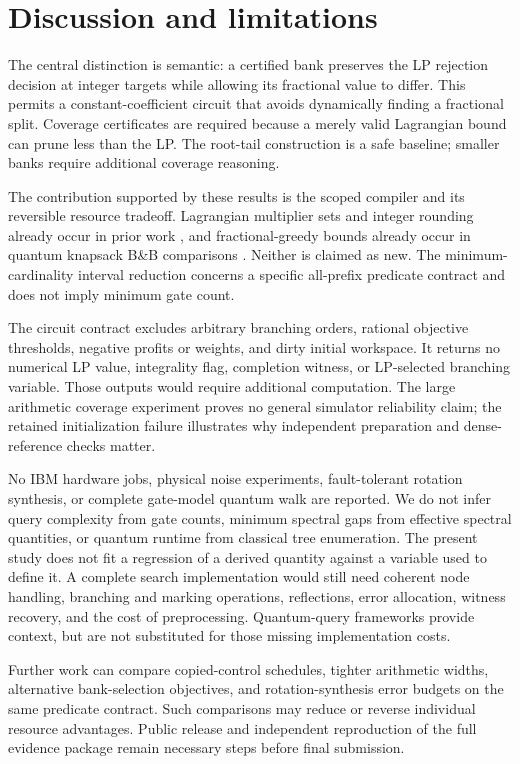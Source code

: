 \documentclass[referee,pdflatex,sn-mathphys-num]{sn-jnl}
\theoremstyle{thmstyleone}
\theoremstyle{thmstyletwo}
\begin{document}
\section{Discussion and limitations}\label{sec:discussion}
The central distinction is semantic: a certified bank preserves the LP rejection decision at integer targets while allowing its fractional value to differ. This permits a constant-coefficient circuit that avoids dynamically finding a fractional split. Coverage certificates are required because a merely valid Lagrangian bound can prune less than the LP. The root-tail construction is a safe baseline; smaller banks require additional coverage reasoning.

The contribution supported by these results is the scoped compiler and its reversible resource tradeoff. Lagrangian multiplier sets and integer rounding already occur in prior work \cite{bozejko2026}, and fractional-greedy bounds already occur in quantum knapsack B\&B comparisons \cite{wilkening2025}. Neither is claimed as new. The minimum-cardinality interval reduction concerns a specific all-prefix predicate contract and does not imply minimum gate count.

The circuit contract excludes arbitrary branching orders, rational objective thresholds, negative profits or weights, and dirty initial workspace. It returns no numerical LP value, integrality flag, completion witness, or LP-selected branching variable. Those outputs would require additional computation. The large arithmetic coverage experiment proves no general simulator reliability claim; the retained initialization failure illustrates why independent preparation and dense-reference checks matter.

No IBM hardware jobs, physical noise experiments, fault-tolerant rotation synthesis, or complete gate-model quantum walk are reported. We do not infer query complexity from gate counts, minimum spectral gaps from effective spectral quantities, or quantum runtime from classical tree enumeration. The present study does not fit a regression of a derived quantity against a variable used to define it. A complete search implementation would still need coherent node handling, branching and marking operations, reflections, error allocation, witness recovery, and the cost of preprocessing. Quantum-query frameworks \cite{ref35,ref24} provide context, but are not substituted for those missing implementation costs.

Further work can compare copied-control schedules, tighter arithmetic widths, alternative bank-selection objectives, and rotation-synthesis error budgets on the same predicate contract. Such comparisons may reduce or reverse individual resource advantages. Public release and independent reproduction of the full evidence package remain necessary steps before final submission.
\end{document}
